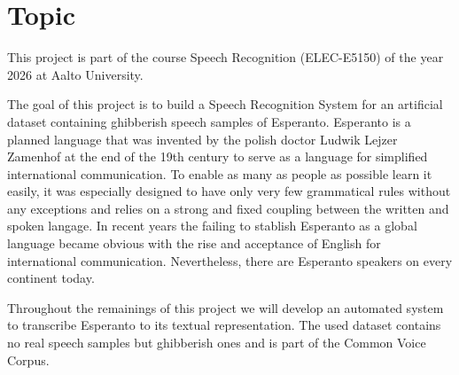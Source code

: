 \chapter{Topic}
\label{topic}
This project is part of the course Speech Recognition (ELEC-E5150) of the year 2026 at Aalto University.

The goal of this project is to build a Speech Recognition System for an artificial dataset containing ghibberish speech samples of Esperanto.
Esperanto is a planned language that was invented by the polish doctor Ludwik Lejzer Zamenhof at the end of the 19th century to serve as a language for simplified international communication.
To enable as many as people as possible learn it easily, it was especially designed to have only very few grammatical rules without any exceptions and relies on a strong and fixed coupling between the written and spoken langage.
In recent years the failing to stablish Esperanto as a global language became obvious with the rise and acceptance of English for international communication.
Nevertheless, there are Esperanto speakers on every continent today.

Throughout the remainings of this project we will develop an automated system to transcribe Esperanto to its textual representation.
The used dataset contains no real speech samples but ghibberish ones and is part of the Common Voice Corpus. 